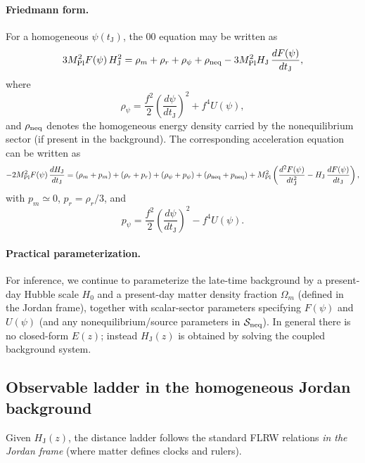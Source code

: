 \documentclass[10pt]{article}
\newcommand{\Om}{\Omega_m}
\newcommand{\HJ}{H_{\mathrm{J}}}
\newcommand{\tJ}{t_{\mathrm{J}}}
\newcommand{\Mp}{M_{\mathrm{Pl}}}
\newcommand{\Fpsi}{F(\psi)}
\newcommand{\Upsi}{U(\psi)}
\begin{document}
\paragraph{Friedmann form.}
For a homogeneous $\psi(\tJ)$, the $00$ equation may be written as
\begin{equation}
3\Mp^{2}\Fpsi\,\HJ^{2}
=
\rho_m+\rho_r+\rho_\psi+\rho_{\rm neq}
-3\Mp^{2}\HJ\,\frac{d\Fpsi}{d\tJ},
\label{eq:JF_friedmann}
\end{equation}
where
\begin{equation}
\rho_\psi = \frac{f^{2}}{2}\left(\frac{d\psi}{d\tJ}\right)^{2} + f^{4}\Upsi,
\end{equation}
and $\rho_{\rm neq}$ denotes the homogeneous energy density carried by the nonequilibrium sector
(if present in the background). The corresponding acceleration equation can be written as
\begin{equation}
-2\Mp^{2}\Fpsi\,\frac{d\HJ}{d\tJ}
=
\left(\rho_m+p_m\right)+\left(\rho_r+p_r\right)+\left(\rho_\psi+p_\psi\right)
+\left(\rho_{\rm neq}+p_{\rm neq}\right)
+\Mp^{2}\left(\frac{d^{2}\Fpsi}{d\tJ^{2}}-\HJ\,\frac{d\Fpsi}{d\tJ}\right),
\label{eq:JF_accel}
\end{equation}
with $p_m\simeq 0$, $p_r=\rho_r/3$, and
\begin{equation}
p_\psi = \frac{f^{2}}{2}\left(\frac{d\psi}{d\tJ}\right)^{2} - f^{4}\Upsi.
\end{equation}

\paragraph{Practical parameterization.}
For inference, we continue to parameterize the late-time background by a present-day Hubble scale $H_0$
and a present-day matter density fraction $\Om$ (defined in the Jordan frame), together with scalar-sector
parameters specifying $\Fpsi$ and $\Upsi$ (and any nonequilibrium/source parameters in $\mathcal{S}_{\rm neq}$).
In general there is no closed-form $E(z)$; instead $\HJ(z)$ is obtained by solving the coupled background system.

\subsection{Observable ladder in the homogeneous Jordan background}
\label{sec:jordan_ladder}

Given $\HJ(z)$, the distance ladder follows the standard FLRW relations \emph{in the Jordan frame}
(where matter defines clocks and rulers).
\end{document}
